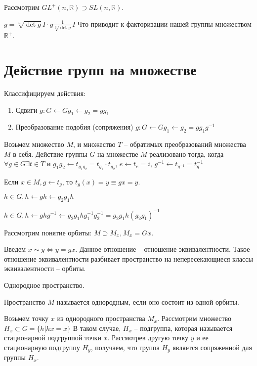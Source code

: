 \documentclass[10pt,a4paper]{article}
\begin{document}
		Рассмотрим $GL^{+}\left(n, \mathbb{R}\right) \supset SL\left(n, \mathbb{R}\right)$.
		
		$g = \sqrt[n]{\det g}I\cdot g\frac{1}{\sqrt[n]{\det g}} I$ 
		Что приводит к факторизации нашей группы множеством $\mathbb{R^{+}}$.
		
	\section{Действие групп на множестве}
	
		Классифицируем действия:
		
		\begin{enumerate}
			\item Сдвиги $g: G\leftarrow G g_{1} \leftarrow g_{2} = gg_{1}$
			\item Преобразование подобия (сопряжения) $g: G \leftarrow G g_{1}\leftarrow g_{2} = gg_{1}g^{-1}$
		\end{enumerate}
		
		Возьмем множество $M$, и множество $T$ -- обратимых преобразований множества $M$ в себя. Действие группы $G$ на множестве $M$ реализовано тогда, когда $\forall g \in G \exists t \in T$ и $g_{1}g_{2} \leftarrow t_{g_{1}g_{2}} = t_{g_{1}}\cdot t_{g_{2}}$, $e \leftarrow t_{e} = i$, $g^{-1} \leftarrow t_{g^{-1}} = t^{-1}_{g}$
		
		Если $x \in M, g \leftarrow t_{g}$, то $t_{g}\left(x\right) = y \equiv gx = y$.
		
		$h \in G, h\leftarrow gh \leftarrow g_{2}g_{1}h$
		
		$h \in G, h \leftarrow ghg^{-1} \leftarrow g_{2}g_{1}hg_{1}^{-1}g_{2}^{-1} = g_{2}g_{1}h\left(g_{2}g_{1}\right)^{-1}$
		
		Рассмотрим понятие орбиты: $M \supset M_{x}, M_{x} = Gx$.
		
		Введем $x \sim y \Leftrightarrow y = gx$. Данное отношение -- отношение эквивалентности. Такое отношение эквивалентности разбивает пространство на непересекающиеся классы эквивалентности -- орбиты.
		
		Однородное пространство.
		
		Пространство $M$ называется однородным, если оно состоит из одной орбиты.
		
		Возьмем точку $x$ из однородного пространства $M_{x}$. Рассмотрим множество $H_{x} \subset G = \lbrace h | hx = x\rbrace$ В таком случае, $H_{x}$ -- подгруппа, которая называется стационарной подгруппой точки $x$. Рассмотрев другую точку $y$ и ее стационарную подгруппу $H_{y}$, получаем, что группа $H_{y}$ является сопряженной для группы $H_{x}$.
		
\end{document}

